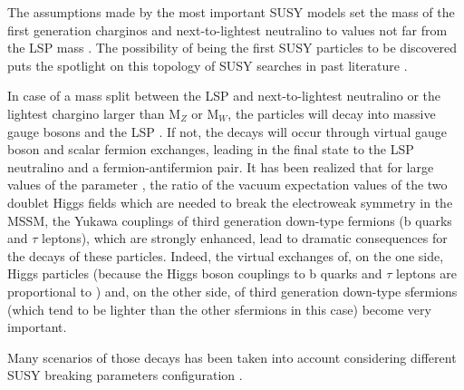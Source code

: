 \FloatBarrier

The assumptions made by the most important SUSY models set the mass of the first generation charginos \charginopm and next-to-lightest neutralino \neutralinotwo to values not far from the LSP mass \neutralinoone. The possibility of being the first SUSY particles to be discovered puts the spotlight on this topology of SUSY searches in past literature \cite{Abel:2000vs}. 

In case of a mass split between the LSP and next-to-lightest neutralino \neutralinotwo or the lightest chargino \charginopm larger than $\text{M}_{Z}$ or $\text{M}_{W}$, the particles will decay into massive gauge bosons and the LSP \neutralinoone. If not, the decays will occur through virtual gauge boson and scalar fermion exchanges, leading in the final state to the LSP neutralino and a fermion-antifermion pair. It has been realized \cite{Baer:1998bj, Baer:1998sz, Bartl:1999iw, Djouadi:2000aq} that for large values of the parameter \tanbeta, the ratio of the vacuum expectation values of the two doublet Higgs fields which are needed to break the electroweak symmetry in the MSSM, the Yukawa couplings of third generation down-type fermions (b quarks and $\tau$ leptons), which are strongly enhanced, lead to dramatic consequences for the decays of these particles. Indeed, the virtual exchanges of, on the one side, Higgs particles (because the Higgs boson couplings to b quarks and $\tau$ leptons are proportional to \tanbeta) and, on the other side, of third generation down-type sfermions (which tend to be lighter than the other sfermions in this case) become very important.

Many scenarios of those decays has been taken into account considering different SUSY breaking parameters configuration \cite{Djouadi:2001fa}. 

